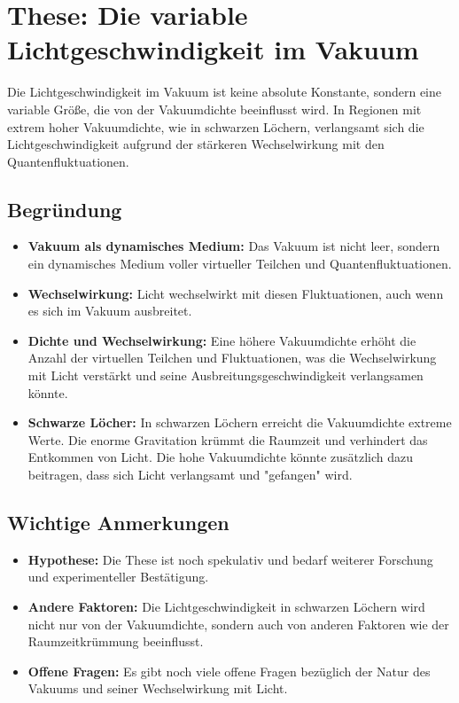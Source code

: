 \documentclass{article}
\begin{document}
	
	\section*{These: Die variable Lichtgeschwindigkeit im Vakuum}
	
	Die Lichtgeschwindigkeit im Vakuum ist keine absolute Konstante, sondern eine variable Größe, die von der Vakuumdichte beeinflusst wird. In Regionen mit extrem hoher Vakuumdichte, wie in schwarzen Löchern, verlangsamt sich die Lichtgeschwindigkeit aufgrund der stärkeren Wechselwirkung mit den Quantenfluktuationen.
	
	\subsection*{Begründung}
	
	\begin{itemize}
		\item \textbf{Vakuum als dynamisches Medium:} Das Vakuum ist nicht leer, sondern ein dynamisches Medium voller virtueller Teilchen und Quantenfluktuationen.
		\item \textbf{Wechselwirkung:} Licht wechselwirkt mit diesen Fluktuationen, auch wenn es sich im Vakuum ausbreitet.
		\item \textbf{Dichte und Wechselwirkung:} Eine höhere Vakuumdichte erhöht die Anzahl der virtuellen Teilchen und Fluktuationen, was die Wechselwirkung mit Licht verstärkt und seine Ausbreitungsgeschwindigkeit verlangsamen könnte.
		\item \textbf{Schwarze Löcher:} In schwarzen Löchern erreicht die Vakuumdichte extreme Werte. Die enorme Gravitation krümmt die Raumzeit und verhindert das Entkommen von Licht. Die hohe Vakuumdichte könnte zusätzlich dazu beitragen, dass sich Licht verlangsamt und "gefangen" wird.
	\end{itemize}
	
	\subsection*{Wichtige Anmerkungen}
	
	\begin{itemize}
		\item \textbf{Hypothese:} Die These ist noch spekulativ und bedarf weiterer Forschung und experimenteller Bestätigung.
		\item \textbf{Andere Faktoren:} Die Lichtgeschwindigkeit in schwarzen Löchern wird nicht nur von der Vakuumdichte, sondern auch von anderen Faktoren wie der Raumzeitkrümmung beeinflusst.
		\item \textbf{Offene Fragen:} Es gibt noch viele offene Fragen bezüglich der Natur des Vakuums und seiner Wechselwirkung mit Licht.
	\end{itemize}
	
\end{document}
